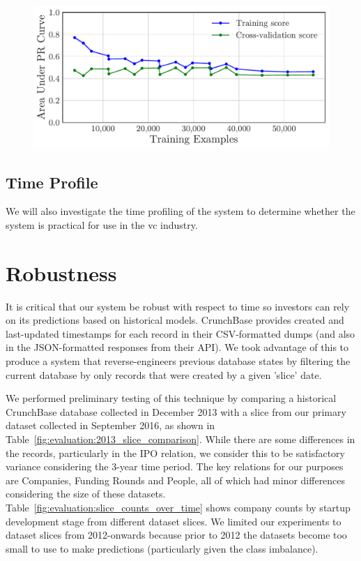 \documentclass[../thesis/thesis.tex]{subfiles}
\begin{document}
\begin{figure}[!htb]
    \centering
    \includegraphics[width=\textwidth]{../figures/evaluation/efficiency_learning_curve} %
    \caption[Learning curve]{}
    \label{fig:evaluation:efficiency_learning_curve}
\end{figure}

\subsection{Time Profile}

We will also investigate the time profiling of the system to determine whether the system is practical for use in the \gls{vc} industry. %


\section{Robustness}

It is critical that our system be robust with respect to time so investors can rely on its predictions based on historical models. CrunchBase provides created and last-updated timestamps for each record in their CSV-formatted dumps (and also in the JSON-formatted responses from their API). We took advantage of this to produce a system that reverse-engineers previous database states by filtering the current database by only records that were created by a given 'slice' date.

We performed preliminary testing of this technique by comparing a historical CrunchBase database collected in December 2013 with a slice from our primary dataset collected in September 2016, as shown in Table~\ref{fig:evaluation:2013_slice_comparison}. While there are some differences in the records, particularly in the IPO relation, we consider this to be satisfactory variance considering the 3-year time period. The key relations for our purposes are Companies, Funding Rounds and People, all of which had minor differences considering the size of these datasets. Table~\ref{fig:evaluation:slice_counts_over_time} shows company counts by startup development stage from different dataset slices. We limited our experiments to dataset slices from 2012-onwards because prior to 2012 the datasets become too small to use to make predictions (particularly given the class imbalance).
\end{document}
